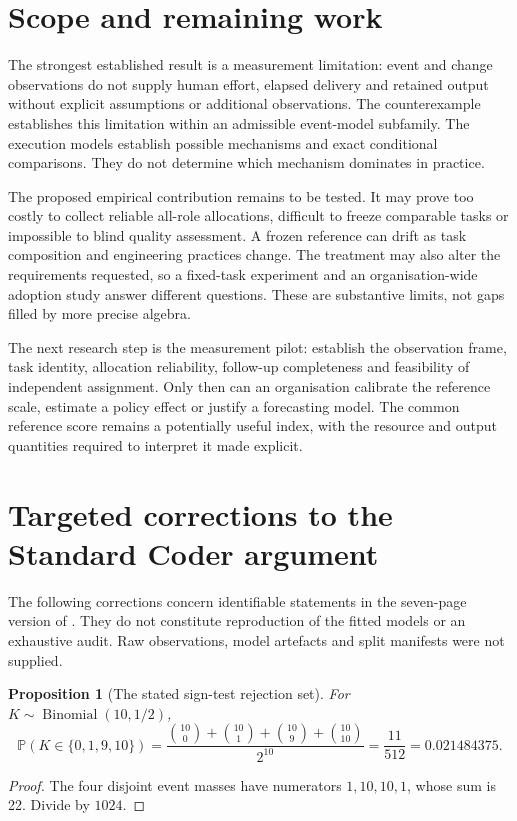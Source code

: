 \documentclass[11pt,a4paper]{amsart}
\newtheorem{proposition}{Proposition}[section]
\theoremstyle{definition}
\theoremstyle{remark}
\newcommand{\Prb}{\mathbb P}
\begin{document}
\section{Scope and remaining work}
\label{sec:limits}

The strongest established result is a measurement limitation: event and change observations do not supply human effort, elapsed delivery and retained output without explicit assumptions or additional observations. The counterexample establishes this limitation within an admissible event-model subfamily. The execution models establish possible mechanisms and exact conditional comparisons. They do not determine which mechanism dominates in practice.

The proposed empirical contribution remains to be tested. It may prove too costly to collect reliable all-role allocations, difficult to freeze comparable tasks or impossible to blind quality assessment. A frozen reference can drift as task composition and engineering practices change. The treatment may also alter the requirements requested, so a fixed-task experiment and an organisation-wide adoption study answer different questions. These are substantive limits, not gaps filled by more precise algebra.

The next research step is the measurement pilot: establish the observation frame, task identity, allocation reliability, follow-up completeness and feasibility of independent assignment. Only then can an organisation calibrate the reference scale, estimate a policy effect or justify a forecasting model. The common reference score remains a potentially useful index, with the resource and output quantities required to interpret it made explicit.

\appendix
\section{Targeted corrections to the Standard Coder argument}
\label{app:audit}

The following corrections concern identifiable statements in the seven-page version of \cite{wright2019}. They do not constitute reproduction of the fitted models or an exhaustive audit. Raw observations, model artefacts and split manifests were not supplied.

\begin{proposition}[The stated sign-test rejection set]
\label{prop:binomial}
For $K\sim\operatorname{Binomial}(10,1/2)$,
\begin{equation}
\label{eq:binomial}
 \Prb(K\in\{0,1,9,10\})
 =\frac{\binom{10}{0}+\binom{10}{1}+\binom{10}{9}+\binom{10}{10}}{2^{10}}
 =\frac{11}{512}=0.021484375.
\end{equation}
\end{proposition}
\begin{proof}
The four disjoint event masses have numerators $1,10,10,1$, whose sum is 22. Divide by $1024$.
\end{proof}
\end{document}
